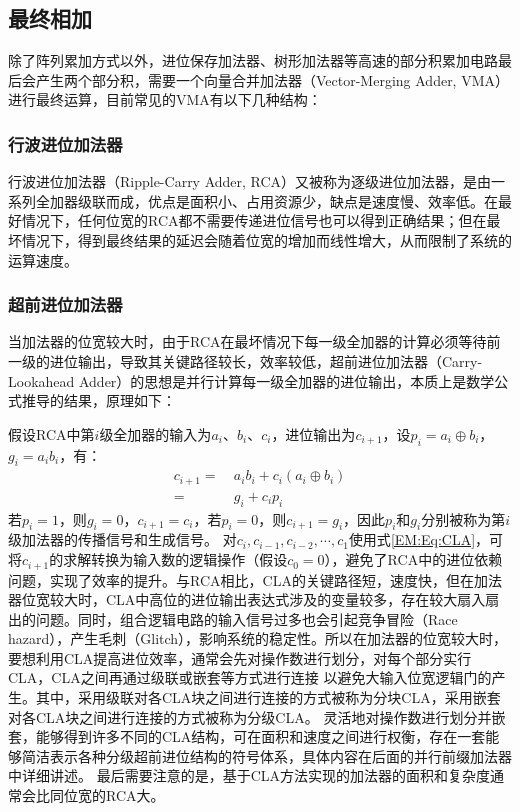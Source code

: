 \subsection{最终相加}

除了阵列累加方式以外，进位保存加法器、树形加法器等高速的部分积累加电路最后会产生两个部分积，需要一个向量合并加法器（Vector-Merging Adder, VMA）进行最终运算，目前常见的VMA有以下几种结构：

\subsubsection{行波进位加法器}

行波进位加法器（Ripple-Carry Adder, RCA）又被称为逐级进位加法器，是由一系列全加器级联而成，优点是面积小、占用资源少，缺点是速度慢、效率低。在最好情况下，任何位宽的RCA都不需要传递进位信号也可以得到正确结果；但在最坏情况下，得到最终结果的延迟会随着位宽的增加而线性增大，从而限制了系统的运算速度。

\subsubsection{超前进位加法器}

当加法器的位宽较大时，由于RCA在最坏情况下每一级全加器的计算必须等待前一级的进位输出，导致其关键路径较长，效率较低，超前进位加法器（Carry-Lookahead Adder）的思想是并行计算每一级全加器的进位输出，本质上是数学公式推导的结果，原理如下：

假设RCA中第$i$级全加器的输入为$a_i$、$b_i$、$c_{i}$，进位输出为$c_{i+1}$，设$p_i = a_i \oplus b_i$，$g_i = a_i b_i$，有：
\begin{equation}
\begin{aligned}
    c_{i+1} = & \ a_i b_i + c_i(a_i \oplus b_i) \\
    = & \ g_i + c_i p_i
\end{aligned}
\label{EM:Eq:CLA}
\end{equation}
若$p_i=1$，则$g_i =0$，$c_{i+1}=c_i$，若$p_i=0$，则$c_{i+1}=g_i$，因此$p_i$和$g_i$分别被称为第$i$级加法器的传播信号和生成信号。
对$c_{i}, c_{i-1},c_{i-2},\cdots,c_{1}$使用式\eqref{EM:Eq:CLA}，可将$c_{i+1}$的求解转换为输入数的逻辑操作（假设$c_0=0$），避免了RCA中的进位依赖问题，实现了效率的提升。与RCA相比，CLA的关键路径短，速度快，但在加法器位宽较大时，CLA中高位的进位输出表达式涉及的变量较多，存在较大扇入扇出的问题。同时，组合逻辑电路的输入信号过多也会引起竞争冒险（Race hazard），产生毛刺（Glitch），影响系统的稳定性。所以在加法器的位宽较大时，要想利用CLA提高进位效率，通常会先对操作数进行划分，对每个部分实行CLA，CLA之间再通过级联或嵌套等方式进行连接%
以避免大输入位宽逻辑门的产生。其中，采用级联对各CLA块之间进行连接的方式被称为分块CLA，采用嵌套对各CLA块之间进行连接的方式被称为分级CLA。
灵活地对操作数进行划分并嵌套，能够得到许多不同的CLA结构，可在面积和速度之间进行权衡，存在一套能够简洁表示各种分级超前进位结构的符号体系，具体内容在后面的并行前缀加法器中详细讲述。
最后需要注意的是，基于CLA方法实现的加法器的面积和复杂度通常会比同位宽的RCA大。

